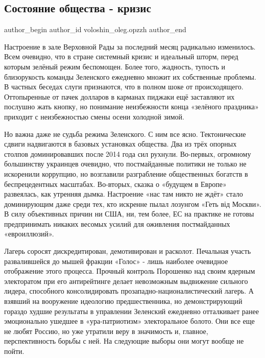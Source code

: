  
 
 
 
 
 
\subsection{Состояние общества - кризис}
\label{sec:03_11_2021.fb.voloshin_oleg.opzzh.1.obschestvo_krizis}
 
\ifcmt
 author_begin
   author_id voloshin_oleg.opzzh
 author_end
\fi

Настроение в зале Верховной Рады за последний месяц радикально изменилось. Всем
очевидно, что в стране системный кризис и идеальный шторм, перед которым
зелёный режим беспомощен. Более того, жадность, тупость и близорукость команды
Зеленского ежедневно множит их собственные проблемы. В частных беседах слуги
признаются, что в полном шоке от происходящего. Оттопыренные от пачек долларов
в карманах пиджаки ещё заставляют их послушно жать кнопку, но понимание
неизбежности конца «зелёного праздника» приходит с неизбежностью смены осени
холодной зимой. 

Но важна даже не судьба режима Зеленского. С ним все ясно. Тектонические сдвиги
надвигаются в базовых установках общества. Два из трёх опорных столпов
доминировавших после 2014 года сил рухнули. Во-первых, огромному большинству
украинцев очевидно, что постмайданные политики не только не искоренили
коррупцию, но возглавили разграбление общественных богатств в беспрецедентных
масштабах. Во-вторых, сказка о «будущем в Европе» развеялась, как утренняя
дымка. Настроение «нас там никто не ждёт» стало доминирующим даже среди тех,
кто искренне пылал лозунгом «Геть від Москви». В силу объективных причин ни
США, ни, тем более, ЕС на практике не готовы предпринимать никаких весомых
усилий для оживления постмайданных «евроиллюзий». 

Лагерь соросят дискредитирован, демотивирован и расколот. Печальная участь
развалившейся до мышей фракции «Голос» - лишь наиболее очевидное отображение
этого процесса. Прочный контроль Порошенко над своим ядерным электоратом при
его антирейтинге делает невозможным выдвижение сильного лидера, способного
консолидировать прозападно-националистический лагерь. А взявший на вооружение
идеологию предшественника, но демонстрирующий гораздо худшие результаты в
управлении Зеленский ежедневно отталкивает ранее эмоционально ушедшее в
«ура-патриотизм» электоральное болото. Они все еще не любят Россию, но уже
утратили веру в значимость и, главное, перспективность борьбы с ней.  На
следующие выборы они могут вообще не пойти. 

